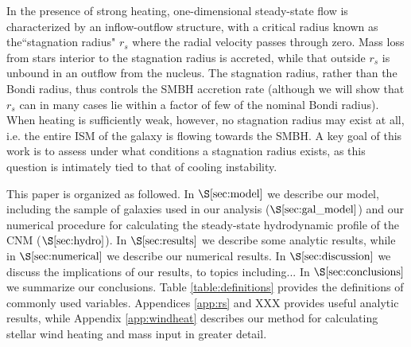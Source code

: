 \documentclass[usenatbib,fleqn]{mn2e}
\newcommand{\rs}{r_s}
\begin{document}
In the presence of strong heating, one-dimensional steady-state flow
is characterized by an inflow-outflow structure, with a critical
radius known as the``stagnation radius" $\rs$ where the radial
velocity passes through zero.  Mass loss from stars interior to the
stagnation radius is accreted, while that outside $\rs$ is unbound in
an outflow from the nucleus.  The stagnation radius, rather than the
Bondi radius, thus controls the SMBH accretion rate (although we will
show that $\rs$ can in many cases lie within a factor of few of the
nominal Bondi radius).  When heating is sufficiently weak, however, no stagnation radius may exist at all, i.e. the entire ISM of the galaxy is flowing towards the SMBH.  A key goal of this work is to
assess under what conditions a stagnation radius exists, as this
question is intimately tied to that of cooling instability.


This paper is organized as followed.  In $\S\ref{sec:model}$ we
describe our model, including the sample of galaxies used in our
analysis ($\S\ref{sec:gal_model}$) and our numerical procedure for
calculating the steady-state hydrodynamic profile of the CNM
($\S\ref{sec:hydro}$).  In $\S\ref{sec:results}$ we describe some
analytic results, while in $\S\ref{sec:numerical}$ we describe our numerical results.  In $\S\ref{sec:discussion}$ we discuss the implications of our results, to topics including...   In $\S\ref{sec:conclusions}$ we summarize our conclusions.  Table \ref{table:definitions} provides the definitions of commonly used variables.  Appendices \ref{app:rs} and XXX provides useful analytic results, while Appendix \ref{app:windheat} describes our method for calculating stellar wind heating and mass input in greater detail.  
\end{document}
